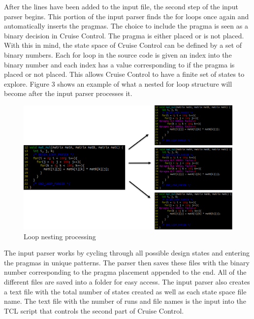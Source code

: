 \documentclass[letterpaper, 10 pt, conference]{IEEEconf}  %
\begin{document}
After the lines have been added to the input file, the second step of the input parser begins. This portion of the input parser finds the for loops once again and automatically inserts the pragmas. The choice to include the pragma is seen as a binary decision in Cruise Control. The pragma is either placed or is not placed. With this in mind, the state space of Cruise Control can be defined by a set of binary numbers. Each for loop in the source code is given an index into the binary number and each index has a value corresponding to if the pragma is placed or not placed. This allows Cruise Control to have a finite set of states to explore. Figure 3 shows an example of what a nested for loop structure will become after the input parser processes it. \newline

\begin{figure}[H]
\centering
\includegraphics[scale=.35]{for_loops.png} 
\caption{Loop nesting processing}
\end{figure}

The input parser works by cycling through all possible design states and entering the pragmas in unique patterns. The parser then saves these files with the binary number corresponding to the pragma placement appended to the end. All of the different files are saved into a folder for easy access. The input parser also creates a text file with the total number of states created as well as each state space file name. The text file with the number of runs and file names is the input into the  TCL script that controls the second part of Cruise Control.  \newline
\end{document}
